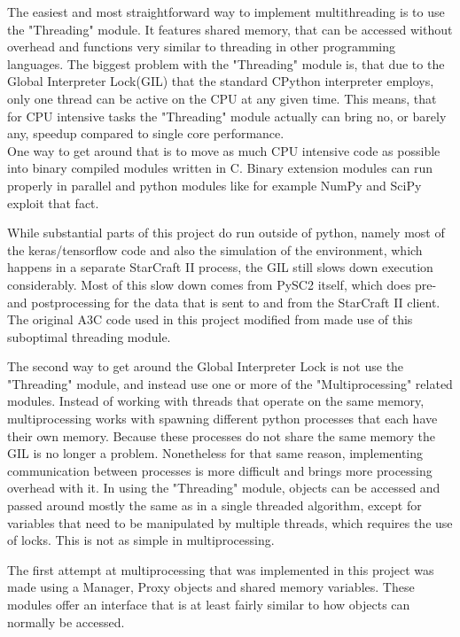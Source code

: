 The easiest and most straightforward way to implement multithreading is to use the "Threading" module. It features shared memory, that can be accessed without overhead and functions very similar to threading in other programming languages. The biggest problem with the "Threading" module is, that due to the Global Interpreter Lock(GIL) that the standard CPython interpreter employs, only one thread can be active on the CPU at any given time. This means, that for CPU intensive tasks the "Threading" module actually can bring no, or barely any, speedup compared to single core performance. \\
One way to get around that is to move as much CPU intensive code as possible into binary compiled modules written in C. Binary extension modules can run properly in parallel and python modules like for example NumPy and SciPy exploit that fact.

While substantial parts of this project do run outside of python, namely most of the keras/tensorflow code and also the simulation of the environment, which happens in a separate StarCraft II process, the GIL still slows down execution considerably. Most of this slow down comes from PySC2 itself, which does pre- and postprocessing for the data that is sent to and from the StarCraft II client. The original A3C code used in this project modified from \cite{a3ccartpole} made use of this suboptimal threading module. 

The second way to get around the Global Interpreter Lock is not use the "Threading" module, and instead use one or more of the "Multiprocessing" related modules.
Instead of working with threads that operate on the same memory, multiprocessing works with spawning different python processes that each have their own memory. Because these processes do not share the same memory the GIL is no longer a problem. Nonetheless for that same reason, implementing communication between processes is more difficult and brings more processing overhead with it.
In using the "Threading" module, objects can be accessed and passed around mostly the same as in a single threaded algorithm, except for variables that need to be manipulated by multiple threads, which requires the use of locks. This is not as simple in multiprocessing.

The first attempt at multiprocessing that was implemented in this project was made using a Manager, Proxy objects and shared memory variables. These modules offer an interface that is at least fairly similar to how objects can normally be accessed.

